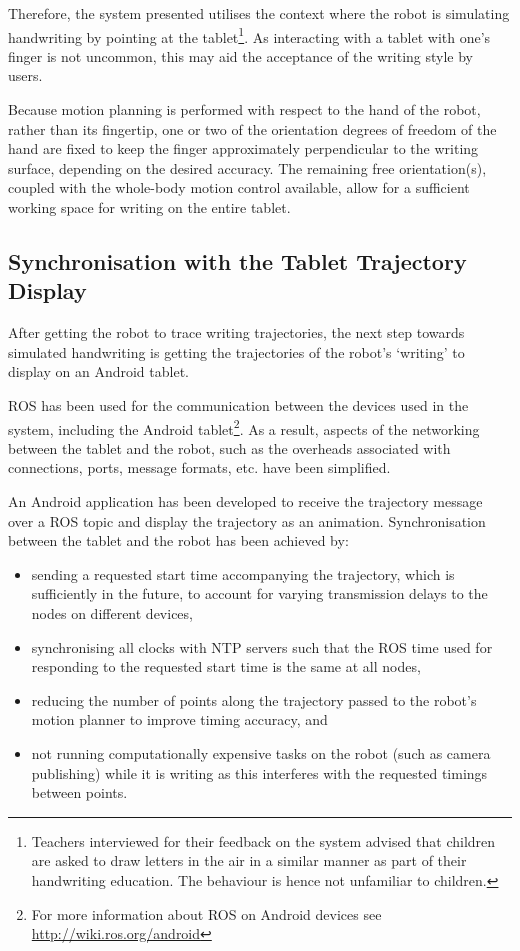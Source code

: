 \documentclass{sig-alternate}
\begin{document}
Therefore, the system presented utilises the context where the robot is
simulating handwriting by pointing at the tablet\footnote{Teachers interviewed
for their feedback on the system advised that children are asked to draw letters
in the air in a similar manner as part of their handwriting education. The behaviour 
is hence not unfamiliar to children.}. As
interacting with a tablet with one's finger is not uncommon, this may aid the
acceptance of the writing style by users. 

Because
motion planning is performed with respect to the hand of the robot, rather than
its fingertip, one or two of the orientation degrees of freedom of the hand
are fixed to keep the finger approximately perpendicular to the writing surface,
depending on the desired accuracy. The remaining free orientation(s), coupled
with the whole-body motion control available, allow for a sufficient working
space for writing on the entire tablet.

\subsection{Synchronisation with the Tablet Trajectory Display}\label{sec:tabletSynch}

After getting the robot to trace writing trajectories, the next step towards
simulated handwriting is getting the trajectories of the robot's `writing' to
display on an Android tablet. 

ROS has been used for the communication between the devices used in the system,
including the Android tablet\footnote{For more information about ROS on Android
devices see \url{http://wiki.ros.org/android}}. As a result, aspects of the
networking between the tablet and the robot, such as the overheads associated
with connections, ports, message formats, etc. have been simplified. 

An Android application has been developed to receive the trajectory message over
a ROS topic and display the trajectory as an
animation. Synchronisation between the tablet and the robot has been achieved by:

\begin{itemize}

    \item sending a requested start time accompanying the trajectory, which is
        sufficiently in the future, to account for varying transmission delays
        to the nodes on different devices,

    \item synchronising all clocks with NTP servers such that the ROS time used
        for responding to the requested start time is the same at all nodes,

    \item reducing the number of points along the trajectory passed to the
        robot's motion planner to improve timing accuracy, and

    \item not running computationally expensive tasks on the robot (such as
        camera publishing) while it is writing as this interferes with the
        requested timings between points. 

\end{itemize}
\end{document}
